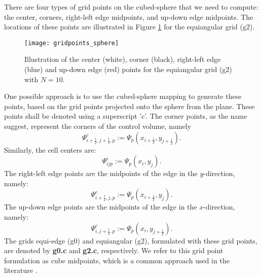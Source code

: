 There are four types of grid points on the cubed-sphere that we need to compute: the center, corners, right-left edge midpoints, and  up-down edge midpoints.
The locations of these points are illustrated in Figure \ref{chp-cs-gridpoints} for the equiangular grid (g2).
\begin{figure}[!htb]
	\centering
	\texttt{[image: gridpoints\_sphere]}
	\caption{Illustration of the center (white), corner (black), right-left edge (blue) and up-down edge (red) points 
		for the equiangular grid (g2) with $N=10$.\label{chp-cs-gridpoints}}
\end{figure}

One possible approach is to use the cubed-sphere mapping to generate these points, based on the grid points projected onto the sphere from the plane.
These points shall be denoted using a superscript 'c'.
The corner points, as the name suggest, represent the corners of the control volume, namely
\begin{equation}
	\Psi_{i+\frac{1}{2},j+\frac{1}{2},p}^c := \Psi_p(x_{i+\frac{1}{2}},y_{j+\frac{1}{2}}).
\end{equation}
Similarly, the cell centers are:
\begin{equation}
	\Psi_{ijp}^c := \Psi_p(x_{i},y_{j}).
\end{equation}
The right-left edge points are the midpoints of the edge in the $y$-direction, namely:
\begin{equation}
	\Psi_{i+\frac{1}{2},j,p}^c := \Psi_p(x_{i+\frac{1}{2}},y_{j}).
\end{equation}
The up-down edge points are the midpoints of the edge in the $x$-direction, namely:
\begin{equation}
	\Psi_{i,j+\frac{1}{2},p}^c := \Psi_p(x_{i},y_{j+\frac{1}{2}}).
\end{equation}
The grids equi-edge (g0) and equiangular (g2), formulated with these grid points, are denoted by \textbf{g0.c} and \textbf{g2.c}, respectively.
We refer to this grid point formulation as cube midpoints, which is a common approach used in the literature \citep{guo:2014,katta:2015,katta:2015b,nair:2005,ullrich:2016}.

